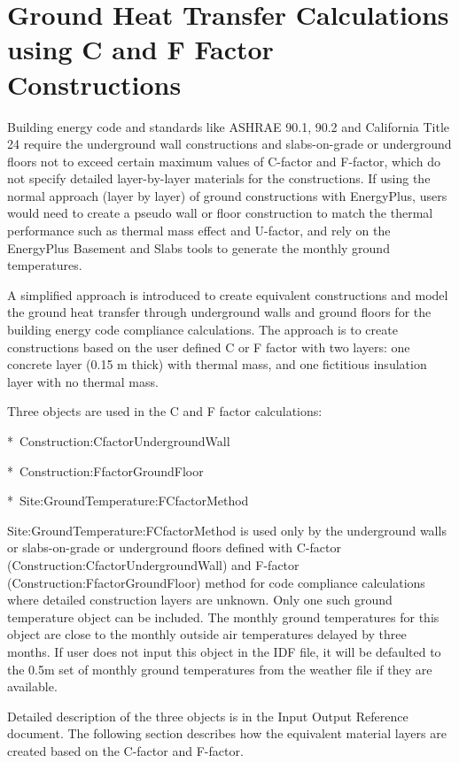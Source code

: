 \section{Ground Heat Transfer Calculations using C and F Factor Constructions}\label{ground-heat-transfer-calculations-using-c-and-f-factor-constructions}

Building energy code and standards like ASHRAE 90.1, 90.2 and California Title 24 require the underground wall constructions and slabs-on-grade or underground floors not to exceed certain maximum values of C-factor and F-factor, which do not specify detailed layer-by-layer materials for the constructions. If using the normal approach (layer by layer) of ground constructions with EnergyPlus, users would need to create a pseudo wall or floor construction to match the thermal performance such as thermal mass effect and U-factor, and rely on the EnergyPlus Basement and Slabs tools to generate the monthly ground temperatures.

A simplified approach is introduced to create equivalent constructions and model the ground heat transfer through underground walls and ground floors for the building energy code compliance calculations. The approach is to create constructions based on the user defined C or F factor with two layers: one concrete layer (0.15 m thick) with thermal mass, and one fictitious insulation layer with no thermal mass.

Three objects are used in the C and F factor calculations:

*~Construction:CfactorUndergroundWall

*~Construction:FfactorGroundFloor

*~Site:GroundTemperature:FCfactorMethod

Site:GroundTemperature:FCfactorMethod is used only by the underground walls or slabs-on-grade or underground floors defined with C-factor (Construction:CfactorUndergroundWall) and F-factor (Construction:FfactorGroundFloor) method for code compliance calculations where detailed construction layers are unknown. Only one such ground temperature object can be included. The monthly ground temperatures for this object are close to the monthly outside air temperatures delayed by three months. If user does not input this object in the IDF file, it will be defaulted to the 0.5m set of monthly ground temperatures from the weather file if they are available.

Detailed description of the three objects is in the Input Output Reference document. The following section describes how the equivalent material layers are created based on the C-factor and F-factor.

